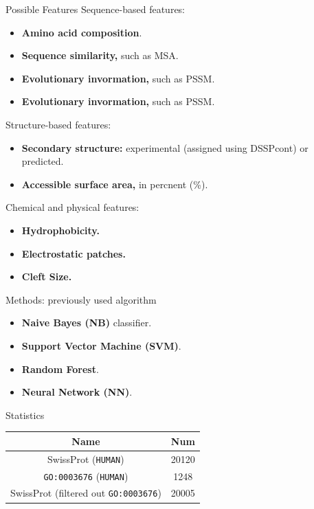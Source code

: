 \documentclass[pdf]
{beamer}
\begin{document}
\begin{frame}{Possible Features}
	Sequence-based features:
	\begin{itemize}
		\item \textbf{Amino acid composition}.
		\item \textbf{Sequence similarity,} such as MSA.
		\item \textbf{Evolutionary invormation,} such as PSSM. 
		\item \textbf{Evolutionary invormation,} such as PSSM. 
	\end{itemize}
	Structure-based features:
	\begin{itemize}
		\item \textbf{Secondary structure:} experimental (assigned using DSSPcont) or predicted.
		\item \textbf{Accessible surface area,} in percnent (\%).
	\end{itemize}
	Chemical and physical features:
	\begin{itemize}
		\item \textbf{Hydrophobicity.}
		\item \textbf{Electrostatic patches.}
		\item \textbf{Cleft Size.}
	\end{itemize}
\end{frame}

\begin{frame}{Methods: previously used algorithm}
	\begin{itemize}
		\item \textbf{Naive Bayes (NB)} classifier.
		\item \textbf{Support Vector Machine (SVM)}.
		\item \textbf{Random Forest}.
		\item \textbf{Neural Network (NN)}.
	\end{itemize}
\end{frame}

\begin{frame}{Statistics}
	\begin{center}
		\begin{tabular}{| c | c |}
			\hline
			Name & Num\\
			\hline
			SwissProt (\texttt{HUMAN}) & 20120\\
			\texttt{GO:0003676} (\texttt{HUMAN}) & 1248\\
			SwissProt (filtered out \texttt{GO:0003676}) & 20005 \\
			\hline
		\end{tabular}	
	\end{center}
\end{frame}
	
\end{document}

